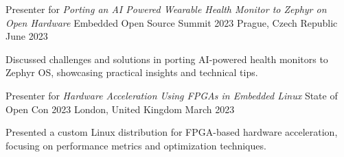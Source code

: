 \begin{cventries}
	\cventry
	{Presenter for \textit{Porting an AI Powered Wearable Health Monitor to Zephyr on Open Hardware}}
	{Embedded Open Source Summit 2023}
	{Prague, Czech Republic}
	{June 2023}
	{
		\begin{cvitems}
		\item {Discussed challenges and solutions in porting AI-powered health monitors to Zephyr OS, showcasing practical insights and technical tips.}
		\end{cvitems}
	}

	\cventry
	{Presenter for \textit{Hardware Acceleration Using FPGAs in Embedded Linux}}
	{State of Open Con 2023}
	{London, United Kingdom}
	{March 2023}
	{
		\begin{cvitems}
		\item {Presented a custom Linux distribution for FPGA-based hardware acceleration, focusing on performance metrics and optimization techniques.}
		\end{cvitems}
	}
\end{cventries}
